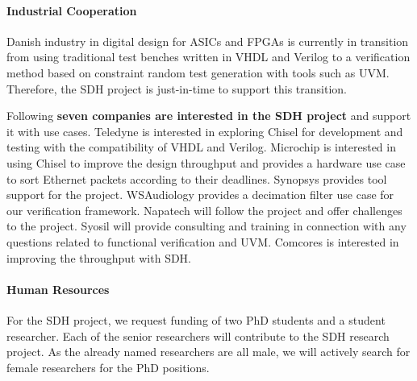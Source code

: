 \documentclass[fleqn,12pt]{article}
\begin{document}
\paragraph*{Industrial Cooperation}

Danish industry in digital design for ASICs and FPGAs is currently in transition from using traditional
test benches written in VHDL and Verilog to a verification method based on constraint random
test generation with tools such as UVM. Therefore, the SDH project is just-in-time to support this
transition.

Following {\bf seven companies are interested in the SDH project} and support it with use cases.
Teledyne is interested in exploring Chisel for development and testing with the compatibility of VHDL and Verilog.
Microchip is interested in using Chisel to improve the design throughput and
provides a hardware use case to sort Ethernet packets according to their deadlines.
Synopsys provides tool support for the project.
WSAudiology provides a decimation filter use case for our verification framework.
Napatech will follow the project and offer challenges to the project.
Syosil will provide consulting and training in connection with any questions related to functional verification and UVM.
Comcores is interested in improving the throughput with SDH.


%

\paragraph*{Human Resources}

For the SDH project, we request funding of two PhD students and a student researcher.
Each of the senior researchers will contribute to the SDH research project.
%
%
As the already named researchers are all male, we will actively search
for female researchers for the PhD positions.
\end{document}
